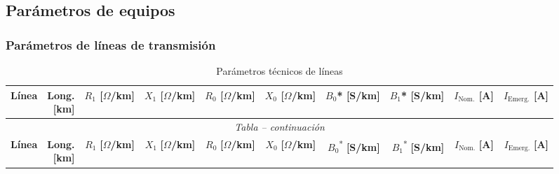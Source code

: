 \documentclass[12pt]{article}
\begin{document}
\subsection{Parámetros de equipos}
\subsubsection{Parámetros de líneas de transmisión}


\begin{center}
\small
\setlength{\tabcolsep}{2pt}
\renewcommand{\arraystretch}{1.15}

\begin{longtable}{|p{5.8cm}|r|r|r|r|r|r|r|r|r|}
\caption{Parámetros técnicos de líneas}
\label{tab:parametros_lineas} \\

\hline
\textbf{Línea} &
\makecell{\textbf{Long.}\\\textbf{[km]}} &
\makecell{\textbf{$R_1$}\\\textbf{[$\Omega$/km]}} &
\makecell{\textbf{$X_1$}\\\textbf{[$\Omega$/km]}} &
\makecell{\textbf{$R_0$}\\\textbf{[$\Omega$/km]}} &
\makecell{\textbf{$X_0$}\\\textbf{[$\Omega$/km]}} &
\makecell{\textbf{$B_0$*}\\\textbf{[S/km]}} &
\makecell{\textbf{$B_1$*}\\\textbf{[S/km]}} &
\makecell{\textbf{$I_{\mathrm{Nom.}}$}\\\textbf{[A]}} &
\makecell{\textbf{$I_{\mathrm{Emerg.}}$}\\\textbf{[A]}} \\
\hline
\endfirsthead

\hline
\multicolumn{10}{|c|}{\textit{Tabla \thetable{} -- continuación}} \\
\hline

\textbf{Línea} &
\makecell{\textbf{Long.}\\\textbf{[km]}} &
\makecell{\textbf{$R_1$}\\\textbf{[$\Omega$/km]}} &
\makecell{\textbf{$X_1$}\\\textbf{[$\Omega$/km]}} &
\makecell{\textbf{$R_0$}\\\textbf{[$\Omega$/km]}} &
\makecell{\textbf{$X_0$}\\\textbf{[$\Omega$/km]}} &
\makecell{\textbf{$B_0$}\textsuperscript{*}\\\textbf{[S/km]}} &
\makecell{\textbf{$B_1$}\textsuperscript{*}\\\textbf{[S/km]}} &
\makecell{\textbf{$I_{\mathrm{Nom.}}$}\\\textbf{[A]}} &
\makecell{\textbf{$I_{\mathrm{Emerg.}}$}\\\textbf{[A]}} \\
\hline
\endhead


\end{longtable}
\end{center}
\end{document}
